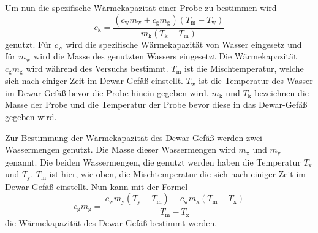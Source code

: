 Um nun die spezifische Wärmekapazität einer Probe zu bestimmen wird
\begin{equation}
   c_\text{k} = \frac{(c_\text{w}m_\text{w} + c_\text{g}m_\text{g})(T_\text{m}-T_\text{w})}{m_\text{k}(T_\text{k}-T_\text{m})} 
   \label{eqn:kapa}
\end{equation}
genutzt.
Für $c_\text{w}$ wird die spezifische Wärmekapazität von Wasser eingesetz und für $m_\text{w}$ wird die Masse des genutzten Wassers eingesetzt
Die Wärmekapazität $c_\text{g}m_\text{g}$ wird während des Versuchs bestimmt.
$T_\text{m}$ ist die Mischtemperatur, welche sich nach einiger Zeit im Dewar-Gefäß einstellt.
$T_\text{w}$ ist die Temperatur des Wasser im Dewar-Gefäß bevor die Probe hinein gegeben wird.
$m_\text{k}$ und $T_\text{k}$ bezeichnen die Masse der Probe und die Temperatur der Probe bevor diese in das Dewar-Gefäß gegeben wird.

Zur Bestimmung der Wärmekapazität des Dewar-Gefäß werden zwei Wassermengen genutzt.
Die Masse dieser Wassermengen wird $m_\text{x}$ und $m_\text{y}$ genannt.
Die beiden Wassermengen, die genutzt werden haben die Temperatur $T_\text{x}$ und $T_\text{y}$.
$T_\text{m}$ ist hier, wie oben, die Mischtemperatur die sich nach einiger Zeit im Dewar-Gefäß einstellt.
Nun kann mit der Formel
\begin{equation}
    c_\text{g} m_\text{g} = \, \frac{c_\text{w}m_\text{y}(T_\text{y}-T_\text{m})-c_\text{w}m_\text{x}(T_\text{m}-T_\text{x})}{T_\text{m}-T_\text{x}}
    \label{eqn:dewar}
\end{equation}
die Wärmekapazität des Dewar-Gefäß bestimmt werden.